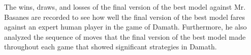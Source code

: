 The wins, draws, and losses of the final version of the best model against Mr. Basanes are recorded to see how well the final version of the best model fares against an expert human player in the game of Damath. Furthermore, he also analyzed the sequence of moves that the final version of the best model made throughout each game that showed significant strategies in Damath.